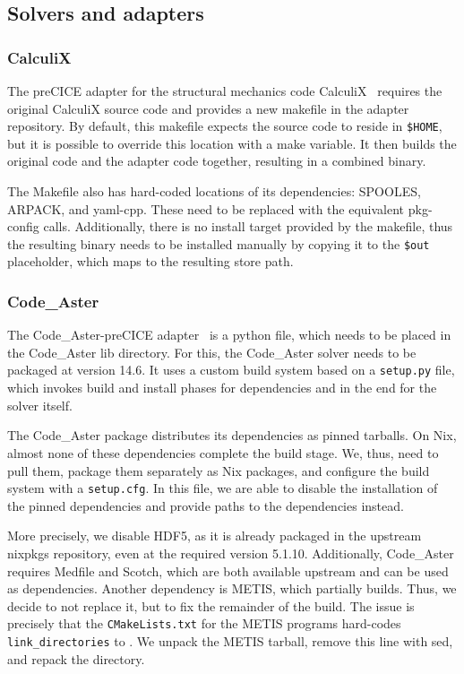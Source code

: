 \documentclass{eceasst}
\begin{document}
\subsection{Solvers and adapters}

\subsubsection{CalculiX}

The preCICE adapter for the structural mechanics code CalculiX~\cite{Uekermann2017_Adapters} requires the original CalculiX source code and provides a new makefile in the adapter repository.
By default, this makefile expects the source code to reside in \texttt{\$HOME}, but it is possible to override this location with a make variable.
It then builds the original code and the adapter code together, resulting in a combined binary.

The Makefile also has hard-coded locations of its dependencies: SPOOLES, ARPACK, and yaml-cpp. These need to be replaced with the equivalent pkg-config calls.
Additionally, there is no install target provided by the makefile, thus the resulting binary needs to be installed manually by copying it to the \texttt{\$out} placeholder, which maps to the resulting store path.

\subsubsection{Code\_Aster}

The Code\_Aster-preCICE adapter~\cite{Uekermann2017_Adapters} is a python file, which needs to be placed in the Code\_Aster lib directory.
For this, the Code\_Aster solver needs to be packaged at version 14.6.
It uses a custom build system based on a \texttt{setup.py} file, which invokes build and install phases for dependencies and in the end for the solver itself.

The Code\_Aster package distributes its dependencies as pinned tarballs.
On Nix, almost none of these dependencies complete the build stage. We, thus, need to pull them, package them separately as Nix packages, and configure the build system with a \texttt{setup.cfg}.
In this file, we are able to disable the installation of the pinned dependencies and provide paths to the dependencies instead.

More precisely, we disable HDF5, as it is already packaged in the upstream nixpkgs repository, even at the required version 5.1.10.
Additionally, Code\_Aster requires Medfile and Scotch, which are both available upstream and can be used as dependencies.
Another dependency is METIS, which partially builds. Thus, we decide to not replace it, but to fix the remainder of the build.
The issue is precisely that the \texttt{CMakeLists.txt} for the METIS programs hard-codes \texttt{link\_directories} to .
We unpack the METIS tarball, remove this line with sed, and repack the directory.
\end{document}
